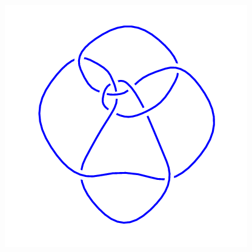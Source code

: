\begin{figure}[H]
\begin{minipage}[b]{.18\linewidth}
    \end{minipage}
    \begin{minipage}[b]{.18\linewidth}
        \centering
        \includegraphics[width=\linewidth]{../data/10_121.png}
    \end{minipage}
\end{figure}
